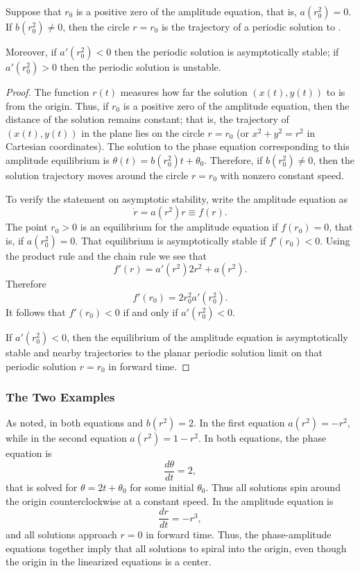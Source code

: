 \documentclass{ximera}
\begin{document}
\begin{prop}
Suppose that $r_0$ is a positive zero of the amplitude equation, that is,
$a(r_0^2)=0$.  If $b(r_0^2)\neq 0$, then the circle $r=r_0$ is the
trajectory of a periodic solution to .  

Moreover, if $a'(r^2_0)<0$ then the periodic solution is asymptotically 
stable; if $a'(r^2_0)>0$ then the periodic solution is unstable.
\end{prop}

\begin{proof}  The function $r(t)$ measures how far the solution $(x(t),y(t))$ to
 is from the origin.  Thus, if $r_0$ is a positive zero of the 
amplitude equation, then the distance of the solution remains constant; that
is, the trajectory of $(x(t),y(t))$ in the plane lies on the circle $r=r_0$
(or $x^2+y^2=r^2$ in Cartesian coordinates).  The solution to the phase 
equation corresponding to this amplitude equilibrium is 
$\theta(t)=b(r_0^2)t+\theta_0$.  Therefore, if $b(r_0^2)\neq 0$, then the 
solution trajectory moves around the circle $r=r_0$ with nonzero constant 
speed.

To verify the statement on asymptotic stability, write the amplitude 
equation as 
\[
\dot{r} = a(r^2)r \equiv f(r).
\]
The point $r_0>0$ is an equilibrium for the amplitude equation if $f(r_0)=0$, 
that is, if $a(r_0^2)=0$.  That equilibrium is asymptotically stable if 
$f'(r_0)<0$.  Using the product rule and the chain rule we see that 
\[
f'(r) = a'(r^2)2r^2 +a(r^2).
\]
Therefore
\[
f'(r_0) = 2r_0^2a'(r_0^2).
\]
It follows that $f'(r_0)<0$ if and only if $a'(r_0^2)<0$.
  
If $a'(r^2_0)<0$, then the equilibrium of the amplitude equation is 
asymptotically stable and nearby trajectories to the planar periodic solution
limit on that periodic solution $r=r_0$ in forward time.  \end{proof} 



\subsubsection*{The Two Examples}

As noted, in both equations  and 
$b(r^2) = 2$.  In the first equation $a(r^2) = -r^2$, while in
the second equation $a(r^2)=1-r^2$.  In both equations, the
phase equation is
\[
\frac{d\theta}{dt} = 2,
\]
that is solved for $\theta = 2t + \theta_0$ for some initial
$\theta_0$.  Thus all solutions spin around the origin
counterclockwise at a constant speed.  In 
the amplitude equation is
\[
\frac{dr}{dt} = -r^3,
\]
and all solutions approach $r=0$ in forward time.  Thus, the 
phase-amplitude equations together imply that all solutions 
to  spiral into the origin, even though the 
origin in the linearized equations is a center. 
\end{document}
